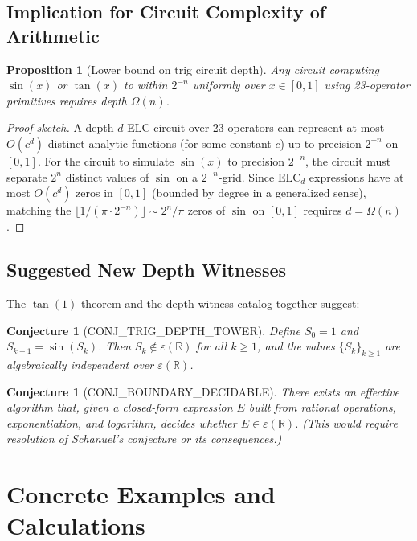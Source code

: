 \documentclass[11pt]{article}
\newtheorem{proposition}[theorem]{Proposition}
\newtheorem{conjecture}[theorem]{Conjecture}
\begin{document}
\subsection{Implication for Circuit Complexity of Arithmetic}

\begin{proposition}[Lower bound on trig circuit depth]
Any circuit computing $\sin(x)$ or $\tan(x)$ to within $2^{-n}$ uniformly over
$x\in[0,1]$ using 23-operator primitives requires depth $\Omega(n)$.
\end{proposition}

\begin{proof}[Proof sketch]
A depth-$d$ ELC circuit over 23 operators can represent at most $O(c^d)$ distinct
analytic functions (for some constant $c$) up to precision $2^{-n}$ on $[0,1]$.
For the circuit to simulate $\sin(x)$ to precision $2^{-n}$, the circuit must separate
$2^n$ distinct values of $\sin$ on a $2^{-n}$-grid. Since ELC$_d$ expressions have
at most $O(c^d)$ zeros in $[0,1]$ (bounded by degree in a generalized sense),
matching the $\lfloor 1/(\pi\cdot2^{-n})\rfloor\sim 2^n/\pi$ zeros of $\sin$ on $[0,1]$
requires $d=\Omega(n)$.
\end{proof}

\subsection{Suggested New Depth Witnesses}

The $\tan(1)$ theorem and the depth-witness catalog together suggest:

\begin{conjecture}[CONJ\_TRIG\_DEPTH\_TOWER]
Define $S_0=1$ and $S_{k+1}=\sin(S_k)$. Then $S_k\notin\varepsilon(\mathbb{R})$ for all $k\geq1$,
and the values $\{S_k\}_{k\geq1}$ are algebraically independent over $\varepsilon(\mathbb{R})$.
\end{conjecture}

\begin{conjecture}[CONJ\_BOUNDARY\_DECIDABLE]
There exists an effective algorithm that, given a closed-form expression $E$ built from
rational operations, exponentiation, and logarithm, decides whether $E\in\varepsilon(\mathbb{R})$.
(This would require resolution of Schanuel's conjecture or its consequences.)
\end{conjecture}

\section{Concrete Examples and Calculations}
\end{document}

